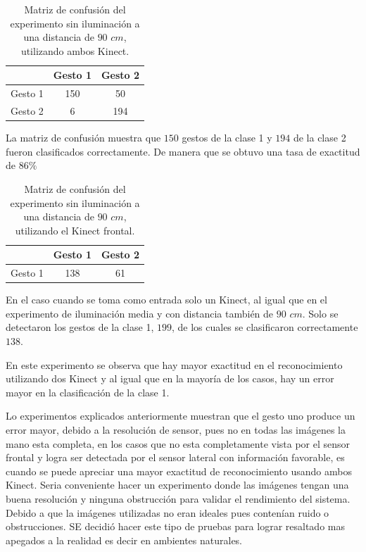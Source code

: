 \begin{itemize}
\begin{table}[h!] 
\begin{center}
\begin{tabular}{ r || c | c |} 
        & Gesto 1 & Gesto 2 \\ \hline \hline  
Gesto 1 & 150     &  50     \\ \hline  
Gesto 2 & 6      &  194     \\   
\end{tabular}
\end{center} 
\caption{Matriz de confusión del experimento sin iluminación a una distancia de $90$ $cm$, utilizando ambos Kinect.}
\label{table:90LnoK2}
\end{table}

La matriz de confusión muestra que $150$ gestos de la clase 1 y $194$ de la clase 2 fueron clasificados correctamente. De manera que se obtuvo una tasa de exactitud de $86 \%$ 

\begin{table}[h!] 
\begin{center}
\begin{tabular}{ r || c | c |} 
 
        & Gesto 1 & Gesto 2 \\ \hline \hline  
Gesto 1 & 138     &  61     \\ \hline  
\end{tabular}
\end{center} 
\caption{Matriz de confusión del experimento sin iluminación a una distancia de $90$ $cm$, utilizando el Kinect frontal.}
\label{table:90LnoK1}
\end{table} 

En el caso cuando se toma como entrada solo un Kinect, al igual que en el experimento de iluminación media y con distancia también de $90$ $cm$. Solo se detectaron los gestos de la clase 1, $199$, de los cuales se clasificaron correctamente $138$. 

En este experimento se observa que hay mayor exactitud en el reconocimiento utilizando dos Kinect y al igual que en la mayoría de los casos, hay un error mayor en la clasificación de la clase 1. 


\end{itemize}

Lo experimentos explicados anteriormente muestran que el gesto uno produce un error mayor, debido a la resolución de sensor, pues no en todas las imágenes la mano esta completa, en los casos que no esta completamente vista por el sensor frontal y logra ser detectada por el sensor lateral con información favorable, es cuando se puede apreciar una mayor exactitud de reconocimiento usando ambos Kinect. 
Seria conveniente hacer un experimento donde las imágenes tengan una buena resolución y ninguna obstrucción para validar el rendimiento del sistema. Debido a que la imágenes utilizadas no eran ideales pues contenían  ruido o obstrucciones. SE decidió hacer este tipo de pruebas para lograr resaltado mas apegados a la realidad es decir en ambientes naturales. 
  

